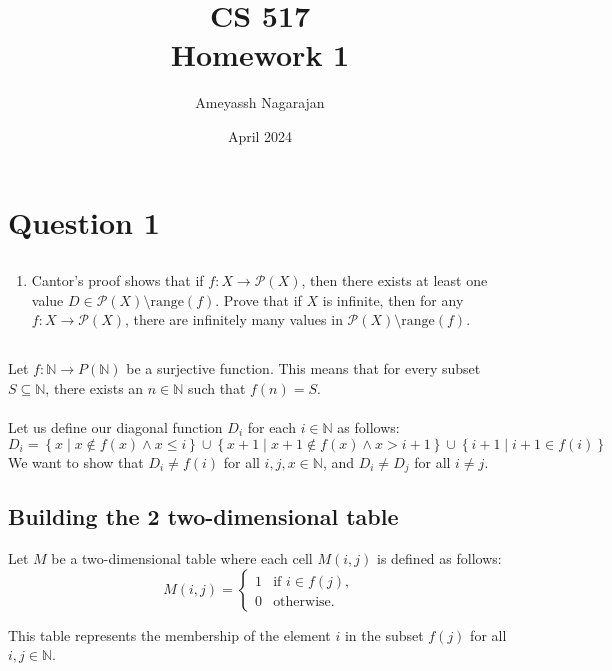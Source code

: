 \documentclass{article}
\title{CS 517 \\ Homework 1}
\author{Ameyassh Nagarajan}
\date{April 2024}
\begin{document}
\maketitle
\section{Question 1}
\subsection*{}
\begin{enumerate}
    \item Cantor's proof shows that if \( f : X \rightarrow \mathcal{P}(X) \), then there exists at least one value \( D \in \mathcal{P}(X) \setminus \text{range}(f) \). Prove that if \( X \) is infinite, then for any \( f : X \rightarrow \mathcal{P}(X) \), there are infinitely many values in \( \mathcal{P}(X) \setminus \text{range}(f) \).
\end{enumerate}
\subsection*{}
Let \( f: \mathbb{N} \rightarrow P(\mathbb{N}) \) be a surjective function. This means that for every subset \( S \subseteq \mathbb{N} \), there exists an \( n \in \mathbb{N} \) such that \( f(n) = S \).
\\
\\
Let us define our diagonal function \( D_i \) for each \( i \in \mathbb{N} \) as follows:
\[
D_i = \left\{ x \mid x \notin f(x) \land x \leq i \right\} \cup 
\left\{ x + 1 \mid x + 1 \notin f(x) \land x > i + 1 \right\} \cup 
\left\{ i+1 \mid i+1 \in f(i) \right\}
\]
We want to show that \( D_i \neq f(i) \) for all \( i,j,x \in \mathbb{N} \), and \( D_i \neq D_j \) for all \( i \neq j \).

\subsection*{Building the 2 two-dimensional table}
Let \( M \) be a two-dimensional table where each cell \( M(i,j) \) is defined as follows:
\[
M(i,j) = 
\begin{cases} 
1 & \text{if } i \in f(j), \\
0 & \text{otherwise}.
\end{cases}
\]

This table represents the membership of the element \( i \) in the subset \( f(j) \) for all \( i, j \in \mathbb{N} \).
\end{document}
